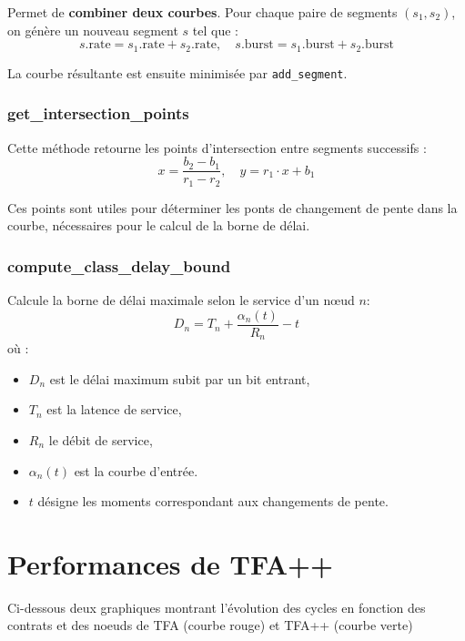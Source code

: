 \documentclass[12pt]{report}
\begin{document}
Permet de \textbf{combiner deux courbes}. Pour chaque paire de segments $(s_1, s_2)$, on génère un nouveau segment $s$ tel que :
\[
s.\text{rate} = s_1.\text{rate} + s_2.\text{rate}, \quad
s.\text{burst} = s_1.\text{burst} + s_2.\text{burst}
\]

La courbe résultante est ensuite minimisée par \texttt{add\_segment}.

\subsubsection*{get\_intersection\_points}

Cette méthode retourne les points d'intersection entre segments successifs :
\[
x = \frac{b_2 - b_1}{r_1 - r_2}, \quad
y = r_1 \cdot x + b_1
\]

Ces points sont utiles pour déterminer les ponts de changement
de pente dans la courbe, nécessaires pour le calcul de la borne de délai.

\subsubsection*{compute\_class\_delay\_bound}

Calcule la borne de délai maximale selon le service d'un nœud $n$:
\[
D_n = T_n + \frac{\alpha_n(t)}{R_n} - t
\]
où :
\begin{itemize}
  \item $D_n$ est le délai maximum subit par un bit entrant,
  \item $T_n$ est la latence de service,
  \item $R_n$ le débit de service,
  \item $\alpha_n(t)$ est la courbe d'entrée.
  \item $t$ désigne les moments correspondant aux changements de pente.
\end{itemize}


\section{Performances de TFA++}

Ci-dessous deux graphiques montrant l'évolution des cycles en fonction des 
contrats et des noeuds de TFA (courbe rouge) et TFA++ (courbe verte)

\bigskip
\end{document}
